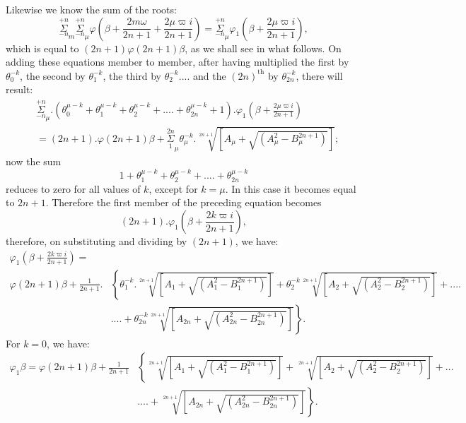 \documentclass{article}
\begin{document}
Likewise we know the sum of the roots:
\[ \overset{+n}{\underset{-n}{\Sigma}}_{m}\overset{+n}{\underset{-n}{\Sigma}}_{\mu}\varphi\left(\beta+\frac{2m\omega}{2n+1}+\frac{2\mu\varpi i}{2n+1}\right)=\overset{+n}{\underset{-n}{\Sigma}}_{\mu}\varphi_{1}\left(\beta+\frac{2\mu\varpi i}{2n+1}\right), \]
which is equal to $(2n+1)\varphi(2n+1)\beta$, as we shall see in what follows. On adding these equations member to member, after having multiplied the first by $\theta_{0}^{-k}$, the second by $\theta_{1}^{-k}$, the third by $\theta_{2}^{-k}....$ and the $(2n)^{\text{th}}$ by $\theta_{2n}^{-k}$, there will result:
\[ \begin{aligned}
&\overset{+n}{\underset{-n}{\Sigma}}_{\mu}.(\theta_{0}^{\mu-k}+\theta_{1}^{\mu-k}+\theta_{2}^{\mu-k}+....+\theta_{2n}^{\mu-k}+1).\varphi_{1}\left(\beta+\frac{2\mu\varpi i}{2n+1}\right)\\
&=(2n+1).\varphi(2n+1)\beta+\overset{2n}{\underset{1}{\Sigma}}_{\mu}\theta_{\mu}^{-k}.\sqrt[2n+1]{[A_{\mu}+\sqrt{(A_{\mu}^{2}-B_{\mu}^{2n+1})}]};
\end{aligned} \]
now the sum
\[ 1+\theta_{1}^{\mu-k}+\theta_{2}^{\mu-k}+....+\theta_{2n}^{\mu-k} \]
reduces to zero for all values of $k$, except for $k=\mu$. In this case it becomes equal to $2n+1$. Therefore the first member of the preceding equation becomes
\[ (2n+1).\varphi_{1}\left(\beta+\frac{2k\varpi i}{2n+1}\right), \]
therefore, on substituting and dividing by $(2n+1)$, we have:
\[ \begin{aligned}
\varphi_{1}\left(\beta+\frac{2k\varpi i}{2n+1}\right)=&\\
\varphi(2n+1)\beta+\frac{1}{2n+1}.&\left\{\theta_{1}^{-k}.\sqrt[2n+1]{[A_{1}+\sqrt{(A_{1}^{2}-B_{1}^{2n+1})}]}+\theta_{2}^{-k}\sqrt[2n+1]{[A_{2}+\sqrt{(A_{2}^{2}-B_{2}^{2n+1})}]}+....\right.\\
&\left.....+\theta_{2n}^{-k}\sqrt[2n+1]{[A_{2n}+\sqrt{(A_{2n}^{2}-B_{2n}^{2n+1})}]}\right\}.
\end{aligned} \tag{76.} \]
For $k=0$, we have:
\[ \begin{aligned}
\varphi_{1}\beta=\varphi(2n+1)\beta+\frac{1}{2n+1}&\left\{\sqrt[2n+1]{[A_{1}+\sqrt{(A_{1}^{2}-B_{1}^{2n+1})}]}+\sqrt[2n+1]{[A_{2}+\sqrt{(A_{2}^{2}-B_{2}^{2n+1})}]}+\ldots\right.\\
&\left.....+\sqrt[2n+1]{[A_{2n}+\sqrt{(A_{2n}^{2}-B_{2n}^{2n+1})}]}\right\}.
\end{aligned} \tag{77.} \]
\end{document}
